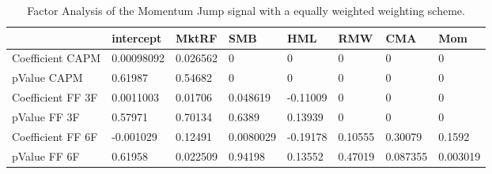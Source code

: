 \begin{table}[H]
\centering
\begin{tabular}{llllllll}
& intercept & MktRF & SMB & HML & RMW & CMA & Mom \\ 
\hline 
Coefficient CAPM & 0.00098092 & 0.026562 & 0 & 0 & 0 & 0 & 0 \\ 
pValue CAPM & 0.61987 & 0.54682 & 0 & 0 & 0 & 0 & 0 \\ 
Coefficient FF 3F & 0.0011003 & 0.01706 & 0.048619 & -0.11009 & 0 & 0 & 0 \\ 
pValue FF 3F & 0.57971 & 0.70134 & 0.6389 & 0.13939 & 0 & 0 & 0 \\ 
Coefficient FF 6F & -0.001029 & 0.12491 & 0.0080029 & -0.19178 & 0.10555 & 0.30079 & 0.1592 \\ 
pValue FF 6F & 0.61958 & 0.022509 & 0.94198 & 0.13552 & 0.47019 & 0.087355 & 0.003019 \\ 
\hline
\end{tabular}
\caption{Factor Analysis of the Momentum Jump signal with a equally weighted weighting scheme.}
\label{MOMJUMPEW_FACTOR}
\end{table}
